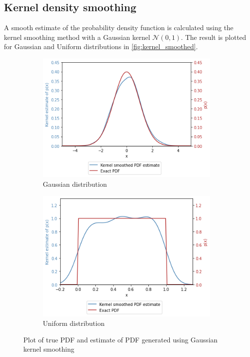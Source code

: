 \documentclass[a4paper]{article}
\begin{document}

\subsection{Kernel density smoothing}

A smooth estimate of the probability density function is calculated using the kernel smoothing method with a Gaussian
kernel $\mathcal{N}(0, 1)$. The result is plotted for Gaussian and Uniform distributions in \autoref{fig:kernel_smoothed}.

\begin{figure}
    \centering
    \begin{subfigure}[b]{0.45\textwidth}
        \centering
        \includegraphics[width=\textwidth]{figures/gaussian_kernel_smoothed.png}
        \caption{Gaussian distribution}
        \label{fig:gaussian_kernel_smoothed}
    \end{subfigure}
    \hfill
    \begin{subfigure}[b]{0.45\textwidth}
        \centering
        \includegraphics[width=\textwidth]{figures/uniform_kernel_smoothed.png}
        \caption{Uniform distribution}
        \label{fig:uniform_kernel_smoothed}
    \end{subfigure}
    \caption{Plot of true PDF and estimate of PDF generated using Gaussian kernel smoothing}
    \label{fig:kernel_smoothed}
\end{figure}
\end{document}
